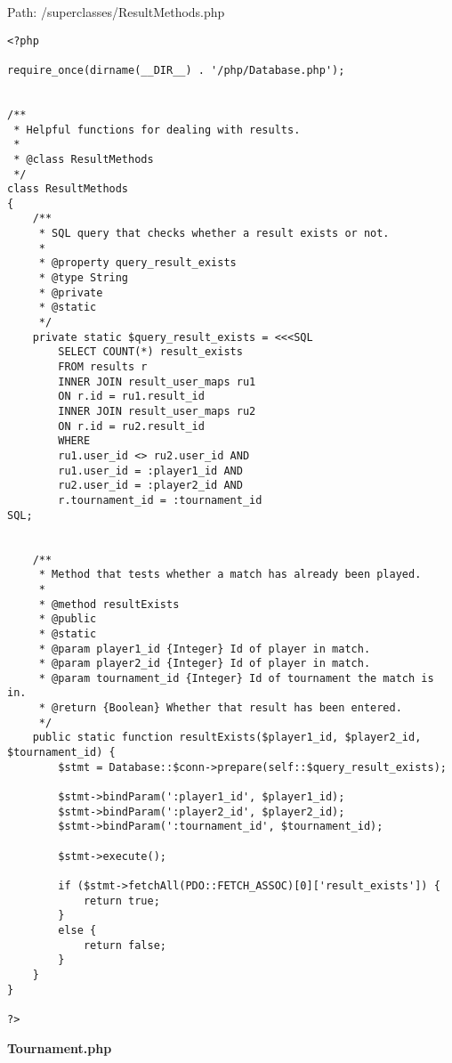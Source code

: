Path: /superclasses/ResultMethods.php
{\scriptsize
\begin{lstlisting}
<?php

require_once(dirname(__DIR__) . '/php/Database.php');


/**
 * Helpful functions for dealing with results.
 *
 * @class ResultMethods
 */
class ResultMethods
{
	/**
	 * SQL query that checks whether a result exists or not.
	 *
	 * @property query_result_exists
	 * @type String
	 * @private
	 * @static
	 */
	private static $query_result_exists = <<<SQL
		SELECT COUNT(*) result_exists
		FROM results r
		INNER JOIN result_user_maps ru1
		ON r.id = ru1.result_id
		INNER JOIN result_user_maps ru2
		ON r.id = ru2.result_id
		WHERE
		ru1.user_id <> ru2.user_id AND
		ru1.user_id = :player1_id AND
		ru2.user_id = :player2_id AND
		r.tournament_id = :tournament_id
SQL;


	/**
	 * Method that tests whether a match has already been played.
	 *
	 * @method resultExists
	 * @public
	 * @static
	 * @param player1_id {Integer} Id of player in match.
	 * @param player2_id {Integer} Id of player in match.
	 * @param tournament_id {Integer} Id of tournament the match is in.
	 * @return {Boolean} Whether that result has been entered.
	 */
	public static function resultExists($player1_id, $player2_id, $tournament_id) {
		$stmt = Database::$conn->prepare(self::$query_result_exists);

		$stmt->bindParam(':player1_id', $player1_id);
		$stmt->bindParam(':player2_id', $player2_id);
		$stmt->bindParam(':tournament_id', $tournament_id);

		$stmt->execute();

		if ($stmt->fetchAll(PDO::FETCH_ASSOC)[0]['result_exists']) {
			return true;
		}
		else {
			return false;
		}
	}
}

?>\end{lstlisting}
}
\textbf{Tournament.php}\label{Tournament.php}

